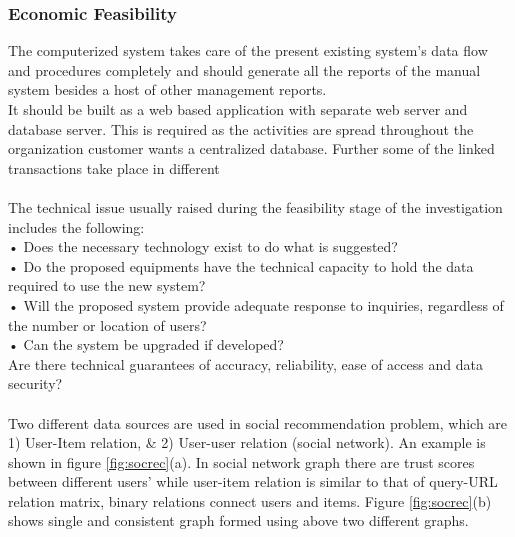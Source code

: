 \subsubsection{Economic Feasibility}
The computerized system takes care of the present existing system’s data flow and procedures completely and should generate all the reports of the manual system besides a host of other management reports.\\
It should be built as a web based application with separate web server and database server. This is required as the activities are spread throughout the organization customer wants a centralized database. Further some of the linked transactions take place in different





\paragraph{} The technical issue usually raised during the feasibility stage of the investigation includes the following:\\
•	Does the necessary technology exist to do what is suggested?\\
•	Do the proposed equipments have the technical capacity to hold the data required to use the new system?\\
•	Will the proposed system provide adequate response to inquiries, regardless of the number or location of users?\\
•	Can the system be upgraded if developed?\\
Are there technical guarantees of accuracy, reliability, ease of access and data security?








\paragraph{}Two different data sources are used in social recommendation problem, which are 1) User-Item relation, \& 2) User-user relation (social network). An example is shown in figure \ref{fig:socrec}(a). In social network graph there are trust scores between different users' while user-item relation is similar to that of query-URL relation matrix, binary relations connect users and items. Figure \ref{fig:socrec}(b) shows single and consistent graph formed using above two different graphs.
